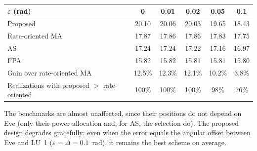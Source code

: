 \documentclass[10pt,a4paper]{article}
\begin{document}
\begin{center}\small
\begin{tabular}{lccccc}
\toprule
$\varepsilon$ (rad) & 0 & 0.01 & 0.02 & 0.05 & 0.1 \\ \midrule
Proposed & 20.10 & 20.06 & 20.03 & 19.65 & 18.43 \\
Rate-oriented MA & 17.87 & 17.86 & 17.86 & 17.83 & 17.75 \\
AS & 17.24 & 17.24 & 17.22 & 17.16 & 16.97 \\
FPA & 15.82 & 15.82 & 15.81 & 15.81 & 15.80 \\ \midrule
Gain over rate-oriented MA & 12.5\% & 12.3\% & 12.1\% & 10.2\% & 3.8\% \\
Realizations with proposed $>$ rate-oriented & 100\% & 100\% & 100\% & 98\% & 76\% \\
\bottomrule
\end{tabular}
\end{center}
The benchmarks are almost unaffected, since their positions do not depend on Eve (only their power allocation and, for AS, the selection do). The proposed design degrades gracefully: even when the error equals the angular offset between Eve and LU~1 ($\varepsilon=\Delta=0.1$~rad), it remains the best scheme on average.
\end{document}
